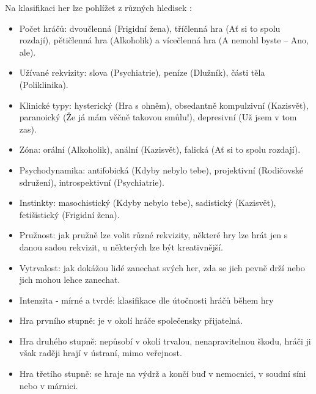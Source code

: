 Na klasifikaci her lze pohlížet z různých hledisek \cite{jak_si_lide_hraji}:
    \begin{itemize}
        \item Počet hráčů: dvoučlenná (Frigidní žena), tříčlenná hra (Ať si to spolu rozdají), pětičlenná hra (Alkoholik) a vícečlenná hra (A nemohl byste -- Ano, ale).
        \item Užívané rekvizity: slova (Psychiatrie), peníze (Dlužník), části těla (Poliklinika).
        \item Klinické typy: hysterický (Hra s ohněm), obsedantně kompulzivní (Kazisvět), paranoický (Že já mám věčně takovou smůlu!), depresivní (Už jsem v tom zas).
        \item Zóna: orální (Alkoholik), anální (Kazisvět), falická (Ať si to spolu rozdají).
        \item Psychodynamika: antifobická (Kdyby nebylo tebe), projektivní (Rodičovské sdružení), introspektivní (Psychiatrie).
        \item Instinkty: masochistický (Kdyby nebylo tebe), sadistický (Kazisvět), fetišistický (Frigidní žena).
        \item Pružnost: jak pružně lze volit různé rekvizity, některé hry lze hrát jen s danou sadou rekvizit, u některých lze být kreativnější.
        \item Vytrvalost: jak dokážou lidé zanechat svých her, zda se jich pevně drží nebo jich mohou lehce zanechat.
        \item Intenzita - mírné a tvrdé: klasifikace dle útočnosti hráčů během hry
        \item Hra prvního stupně: je v okolí hráče společensky přijatelná.
        \item Hra druhého stupně: nepůsobí v okolí trvalou, nenapravitelnou škodu, hráči ji však raději hrají v ústraní, mimo veřejnost.
        \item Hra třetího stupně: se hraje na výdrž a končí buď v nemocnici, v soudní síni nebo v márnici.
    \end{itemize}{}
    
